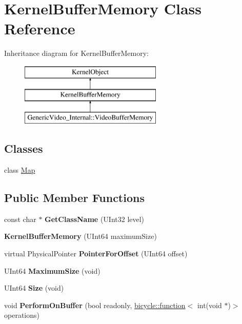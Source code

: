 \hypertarget{class_kernel_buffer_memory}{}\section{Kernel\+Buffer\+Memory Class Reference}
\label{class_kernel_buffer_memory}
Inheritance diagram for Kernel\+Buffer\+Memory\+:\begin{figure}[H]
\begin{center}
\leavevmode
\includegraphics[height=3.000000cm]{class_kernel_buffer_memory}
\end{center}
\end{figure}
\subsection*{Classes}
\begin{DoxyCompactItemize}
\item 
class \hyperlink{class_kernel_buffer_memory_1_1_map}{Map}
\end{DoxyCompactItemize}
\subsection*{Public Member Functions}
\begin{DoxyCompactItemize}
\item 
\mbox{\label{class_kernel_buffer_memory_a6b5677991707c02c1e6d76502b1fc063}} 
const char $\ast$ {\bfseries Get\+Class\+Name} (U\+Int32 level)
\item 
\mbox{\label{class_kernel_buffer_memory_afa3b374430fde17e7485c3896868ceae}} 
{\bfseries Kernel\+Buffer\+Memory} (U\+Int64 maximum\+Size)
\item 
\mbox{\label{class_kernel_buffer_memory_a2aa32a2d21da8013b31df1ac02a7ca96}} 
virtual Physical\+Pointer {\bfseries Pointer\+For\+Offset} (U\+Int64 offset)
\item 
\mbox{\label{class_kernel_buffer_memory_a7c30ac1553880779d4466b5c7201044b}} 
U\+Int64 {\bfseries Maximum\+Size} (void)
\item 
\mbox{\label{class_kernel_buffer_memory_a93ad09eee7ea2085ddba2f1a4d619b24}} 
U\+Int64 {\bfseries Size} (void)
\item 
\mbox{\label{class_kernel_buffer_memory_aec5fef9a9ba0c34f20bc9701b85bdf69}} 
void {\bfseries Perform\+On\+Buffer} (bool readonly, \hyperlink{classbicycle_1_1function}{bicycle\+::function}$<$ int(void $\ast$)$>$ operations)
\end{DoxyCompactItemize}
